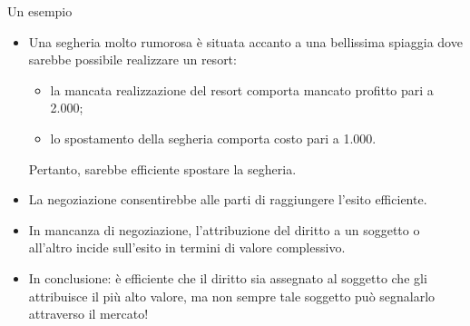 \documentclass[aspectratio=64,12pt]{beamer}
\begin{document}
\begin{frame}{Un esempio}
\begin{itemize}
\item Una segheria molto rumorosa è situata accanto a una bellissima spiaggia dove
sarebbe possibile realizzare un resort:
\begin{itemize}
\item la mancata realizzazione del resort comporta mancato profitto pari a 2.000;
\item lo spostamento della segheria comporta costo pari a 1.000.
\end{itemize}
Pertanto, sarebbe efficiente spostare la segheria.
\item La negoziazione consentirebbe alle parti di raggiungere l'esito efficiente.
\item In mancanza di negoziazione, l'attribuzione del diritto a un soggetto o
  all'altro incide sull'esito in termini di valore complessivo.
\item In conclusione: è efficiente che il diritto sia assegnato al soggetto
  che gli attribuisce il più alto valore, ma non sempre tale soggetto può
  segnalarlo attraverso il mercato!
\end{itemize}
\end{frame}
\end{document}
